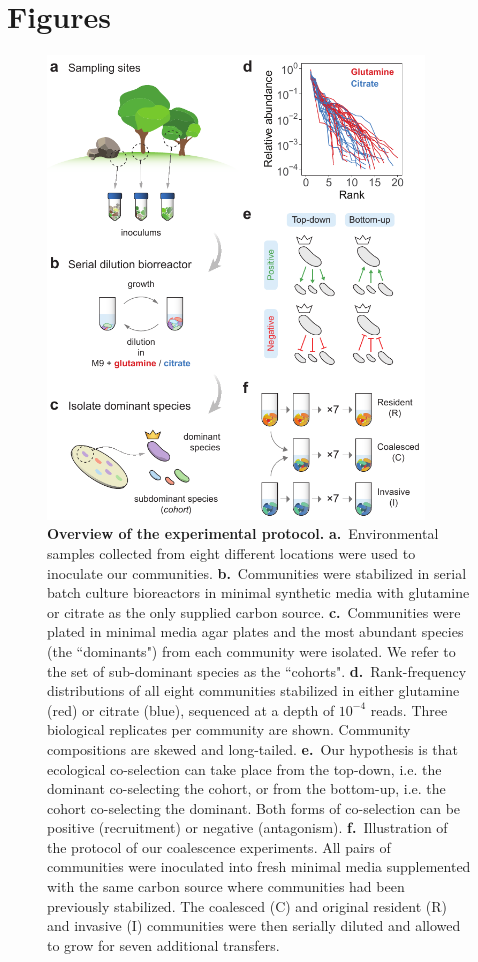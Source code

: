 \documentclass[a4paper,10pt]{article}
\begin{document}
\clearpage

\section*{Figures}\label{figs}

\begin{figure}[!h]
\centering
\internallinenumbers
\includegraphics[width=10cm,keepaspectratio]{figs/fig1.pdf}
\caption{\textbf{Overview of the experimental protocol.}
\textbf{a.}~Environmental samples collected from eight different locations were used
to inoculate our communities.
\textbf{b.}~Communities were stabilized in serial batch culture bioreactors
\cite{Goldford2018} in minimal synthetic media with glutamine or citrate as the
only supplied carbon source.
\textbf{c.}~Communities were plated in minimal media agar plates and the most abundant
species (the ``dominants") from each community were isolated. We refer to the set of
sub-dominant species as the ``cohorts".
\textbf{d.}~Rank-frequency distributions of all eight communities stabilized in either
glutamine (red) or citrate (blue), sequenced at a depth of $10^{-4}$ reads.
Three biological replicates per community are shown.
Community compositions are skewed and long-tailed.
\textbf{e.}~Our hypothesis is that ecological co-selection can take place from the top-down,
i.e. the dominant co-selecting the cohort, or from the bottom-up, i.e. the cohort co-selecting
the dominant. Both forms of co-selection can be positive (recruitment) or negative
(antagonism).
\textbf{f.}~Illustration of the protocol of our coalescence experiments. All pairs of
communities were inoculated into fresh minimal media supplemented with the same carbon
source where communities had been previously stabilized. The coalesced (C) and original
resident (R) and invasive (I) communities were then serially diluted and allowed to grow
for seven additional transfers.}
\label{fig1}
\end{figure}
\end{document}
